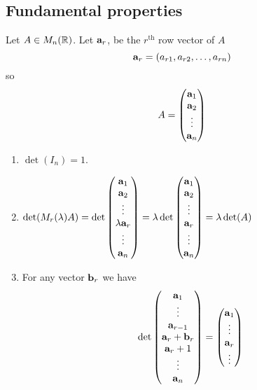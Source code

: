 \documentclass[10pt, a4paper]{article}
\begin{document}
\subsection{Fundamental properties}
Let $A \in M_n(\mathbb{R})$.
Let $\mathbf{a}_{r}$,
be the $r ^ {\text{th}}$ row vector of $A$
\[
\mathbf{a}_r = (a_{r1}, a_{r2}, \dotsc, a_{rn})
\]
so
\[
A = \begin{pmatrix}
    \mathbf{a}_1 \\
    \mathbf{a}_2 \\
    \vdots \\
    \mathbf{a}_n
\end{pmatrix}
\]
\begin{enumerate}[label = (\roman*)]
    \item $\det(I_n) = 1$.
    \item $\det(M_r(\lambda)A) = \det\begin{pmatrix}
    \mathbf{a}_1 \\
    \mathbf{a}_2 \\
    \vdots \\
    \lambda \mathbf{a}_r \\
    \vdots \\
    \mathbf{a}_n
\end{pmatrix} = \lambda \det\begin{pmatrix}
    \mathbf{a}_1 \\
    \mathbf{a}_2 \\
    \vdots \\
    \mathbf{a}_r \\
    \vdots \\
    \mathbf{a}_n
    \end{pmatrix} = \lambda\det(A)$
    \item For any vector $\mathbf{b}_r$ we have
    \[
    \det\begin{pmatrix}
        \mathbf{a}_1 \\
        \vdots \\
        \mathbf{a}_{r - 1} \\
        \mathbf{a}_r + \mathbf{b}_r \\
        \mathbf{a}_r + 1 \\
        \vdots \\
        \mathbf{a}_n
    \end{pmatrix}
    =\begin{pmatrix}
    \mathbf{a}_1 \\
    \vdots \\
    \mathbf{a}_r \\
    \vdots \\

\end{pmatrix}\]
\end{enumerate}
\end{document}
